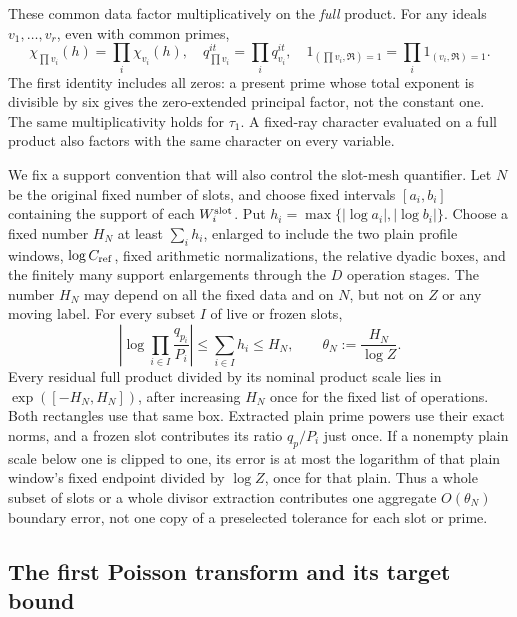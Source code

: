 \documentclass[11pt,a4paper]{article}
\numberwithin{equation}{section}
\numberwithin{figure}{section}
\theoremstyle{definition}
\theoremstyle{remark}
\begin{document}
These common data factor multiplicatively on the \emph{full} product.
For any ideals \(v_1,\ldots,v_r\), even with common primes,
\[
 \chi_{\prod v_i}(h)=\prod_i\chi_{v_i}(h),\quad
 q_{\prod v_i}^{it}=\prod_iq_{v_i}^{it},\quad
 1_{(\prod v_i,\mathfrak R)=1}
   =\prod_i1_{(v_i,\mathfrak R)=1}.
\]
The first identity includes all zeros: a present prime whose total
exponent is divisible by six gives the zero-extended principal
factor, not the constant one.  The same multiplicativity holds for
\(\tau_1\).  A fixed-ray character evaluated on a full product also
factors with the same character on every variable.

We fix a support convention that will also control the slot-mesh
quantifier.  Let \(N\) be the original fixed number of slots, and
choose fixed intervals \([a_i,b_i]\) containing the support of each
\(W_i^{\rm slot}\).  Put
\(h_i=\max\{|\log a_i|,|\log b_i|\}\).  Choose a fixed number
\(H_N\) at least \(\sum_i h_i\), enlarged to include the two plain
profile windows, \(\log C_{\rm ref}\), fixed arithmetic normalizations, the relative dyadic
boxes, and the finitely many support enlargements through the \(D\)
operation stages.  The number \(H_N\) may depend on all the fixed
data and on \(N\), but not on \(Z\) or any moving label.  For every
subset \(I\) of live or frozen slots,
\begin{equation}
 \left|\log\prod_{i\in I}\frac{q_{p_i}}{P_i}\right|
 \le\sum_{i\in I}h_i\le H_N,
 \qquad \theta_N:=\frac{H_N}{\log Z}.
 \label{eq:centered-aggregate-support}
\end{equation}
Every residual full product divided by its nominal product scale lies
in \(\exp([-H_N,H_N])\), after increasing \(H_N\) once for the
fixed list of operations.  Both rectangles use that same box.  Extracted
plain prime powers use their exact norms, and a frozen slot contributes
its ratio \(q_p/P_i\) just once.  If a nonempty plain scale below one
is clipped to one, its error is at most the logarithm of that plain
window's fixed endpoint divided by \(\log Z\), once for that plain.
Thus a whole subset of slots or a whole divisor extraction contributes
one aggregate \(O(\theta_N)\) boundary error, not one copy of a
preselected tolerance for each slot or prime.

\subsection{The first Poisson transform and its target bound}\label{sec:plain-first-transform}
\end{document}
